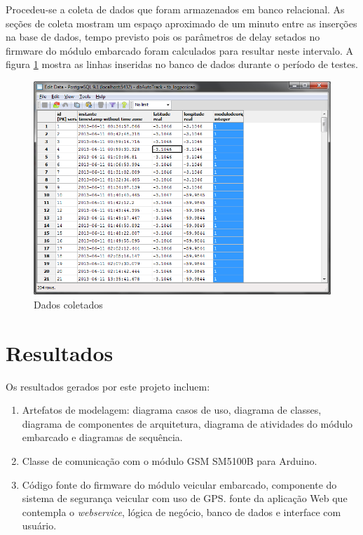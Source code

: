 Procedeu-se a coleta de dados que foram armazenados em banco relacional. As seções de coleta mostram um espaço aproximado de um minuto entre as inserções na base de dados, tempo previsto pois os parâmetros de delay setados no firmware do módulo embarcado foram calculados para resultar neste intervalo. A figura \ref{fig:dadoscoletados} mostra as linhas inseridas no banco de dados durante o período de testes.

\begin{figure}[!htb]
	\centering
	\includegraphics[width=\textwidth]{figures/dados_coletados.png}
	\caption{Dados coletados}
	\label{fig:dadoscoletados}
\end{figure}


\section{Resultados}

Os resultados gerados por este projeto incluem:

\begin{enumerate}
	\item Artefatos de modelagem: diagrama casos de uso, diagrama de classes, diagrama de componentes de arquitetura, diagrama de atividades do módulo embarcado e diagramas de sequência.
	\item Classe de comunicação com o módulo GSM SM5100B para Arduino.
	\item Código fonte do firmware do módulo veicular embarcado, componente do sistema de segurança veicular com uso de GPS.
	 fonte da aplicação Web que contempla o \textit{webservice}, lógica de negócio, banco de dados e interface com usuário. 
\end{enumerate}

